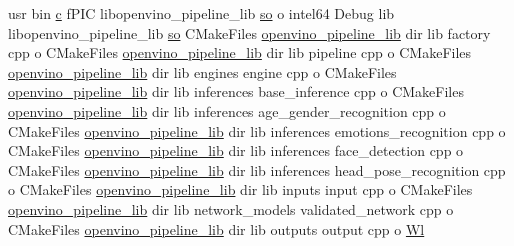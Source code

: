 \begin{DoxyCompactItemize}
usr bin \hyperlink{CMakeCache_8txt_aac1d6a1710812201527c735f7c6afbaa}{c} f\+P\+IC libopenvino\+\_\+pipeline\+\_\+lib \hyperlink{CMakeCache_8txt_aa98797039f48d335ee715de4cd92852f}{so} o intel64 Debug lib libopenvino\+\_\+pipeline\+\_\+lib \hyperlink{CMakeCache_8txt_aa98797039f48d335ee715de4cd92852f}{so} C\+Make\+Files \hyperlink{CMakeCache_8txt_a1825c89fbdf0553625ee2c5a9edcdf7f}{openvino\+\_\+pipeline\+\_\+lib} dir lib factory cpp o C\+Make\+Files \hyperlink{CMakeCache_8txt_a1825c89fbdf0553625ee2c5a9edcdf7f}{openvino\+\_\+pipeline\+\_\+lib} dir lib pipeline cpp o C\+Make\+Files \hyperlink{CMakeCache_8txt_a1825c89fbdf0553625ee2c5a9edcdf7f}{openvino\+\_\+pipeline\+\_\+lib} dir lib engines engine cpp o C\+Make\+Files \hyperlink{CMakeCache_8txt_a1825c89fbdf0553625ee2c5a9edcdf7f}{openvino\+\_\+pipeline\+\_\+lib} dir lib inferences base\+\_\+inference cpp o C\+Make\+Files \hyperlink{CMakeCache_8txt_a1825c89fbdf0553625ee2c5a9edcdf7f}{openvino\+\_\+pipeline\+\_\+lib} dir lib inferences age\+\_\+gender\+\_\+recognition cpp o C\+Make\+Files \hyperlink{CMakeCache_8txt_a1825c89fbdf0553625ee2c5a9edcdf7f}{openvino\+\_\+pipeline\+\_\+lib} dir lib inferences emotions\+\_\+recognition cpp o C\+Make\+Files \hyperlink{CMakeCache_8txt_a1825c89fbdf0553625ee2c5a9edcdf7f}{openvino\+\_\+pipeline\+\_\+lib} dir lib inferences face\+\_\+detection cpp o C\+Make\+Files \hyperlink{CMakeCache_8txt_a1825c89fbdf0553625ee2c5a9edcdf7f}{openvino\+\_\+pipeline\+\_\+lib} dir lib inferences head\+\_\+pose\+\_\+recognition cpp o C\+Make\+Files \hyperlink{CMakeCache_8txt_a1825c89fbdf0553625ee2c5a9edcdf7f}{openvino\+\_\+pipeline\+\_\+lib} dir lib inputs input cpp o C\+Make\+Files \hyperlink{CMakeCache_8txt_a1825c89fbdf0553625ee2c5a9edcdf7f}{openvino\+\_\+pipeline\+\_\+lib} dir lib network\+\_\+models validated\+\_\+network cpp o C\+Make\+Files \hyperlink{CMakeCache_8txt_a1825c89fbdf0553625ee2c5a9edcdf7f}{openvino\+\_\+pipeline\+\_\+lib} dir lib outputs output cpp o \hyperlink{CMakeFiles_2openvino__pipeline__lib_8dir_2link_8txt_a5f884a9f2a1a718e40f017cc1683606c}{Wl}
\item 

\end{DoxyCompactItemize}
